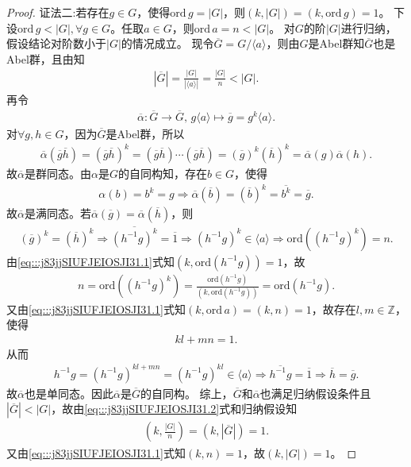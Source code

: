 \documentclass[../../main.tex]{subfiles}%
\begin{document}
\begin{proof}
{\color{blue}证法二:}若存在$g\in G$，使得$\mathrm{ord}\,g=|G|$，则$(k,|G|)=(k,\mathrm{ord}\,g)=1$。
下设$\mathrm{ord}\,g<|G|,\forall g\in G$。任取$a\in G$，则$\mathrm{ord}\,a=n<|G|$。
对$G$的阶$|G|$进行归纳，假设结论对阶数小于$|G|$的情况成立。
现令$\overline{G}=G/\langle a\rangle$，则由$G$是Abel群知$\overline{G}$也是Abel群，且由知
\begin{align}
|\overline{G}|=\frac{|G|}{|\langle a\rangle|}=\frac{|G|}{n}<|G|.
\label{eq:::j83jjSIUFJEIOSJI31.2}
\end{align}
再令
\begin{align*}
\overline{\alpha}:\overline{G}\to\overline{G},\, g\langle a\rangle\mapsto \overline{g}=g^k\langle a\rangle.
\end{align*}
对$\forall g,h\in G$，因为$\overline{G}$是Abel群，所以
\begin{align*}
\overline{\alpha}(\overline{g}\overline{h})=(\overline{g}\overline{h})^k=(\overline{g}\overline{h})\cdots(\overline{g}\overline{h})=(\overline{g})^k(\overline{h})^k=\overline{\alpha}(g)\overline{\alpha}(h).
\end{align*}
故$\overline{\alpha}$是群同态。由$\alpha$是$G$的自同构知，存在$b\in G$，使得
\begin{align*}
\alpha(b)=b^k=g\Longrightarrow \overline{\alpha}(\overline{b})=(\overline{b})^k=\overline{b^k}=\overline{g}.
\end{align*}
故$\overline{\alpha}$是满同态。若$\overline{\alpha}(\overline{g})=\overline{\alpha}(\overline{h})$，则
\begin{align*}
(\overline{g})^k=(\overline{h})^k\Longrightarrow \overline{(h^{-1}g)^k}=\overline{1}\Longrightarrow (h^{-1}g)^k\in\langle a\rangle\Longrightarrow \mathrm{ord}\left((h^{-1}g)^k\right)=n.
\end{align*}
由\eqref{eq:::j83jjSIUFJEIOSJI31.1}式知$(k,\mathrm{ord}(h^{-1}g))=1$，故
\begin{align*}
n=\mathrm{ord}\left((h^{-1}g)^k\right)=\frac{\mathrm{ord}(h^{-1}g)}{(k,\mathrm{ord}(h^{-1}g))}=\mathrm{ord}(h^{-1}g).
\end{align*}
又由\eqref{eq:::j83jjSIUFJEIOSJI31.1}式知$(k,\mathrm{ord}\,a)=(k,n)=1$，故存在$l,m\in\mathbb{Z}$，使得
\begin{align*}
kl+mn=1.
\end{align*}
从而
\begin{align*}
h^{-1}g=(h^{-1}g)^{kl+mn}=(h^{-1}g)^{kl}\in\langle a\rangle\Longrightarrow \overline{h^{-1}g}=\overline{1}\Longrightarrow \overline{h}=\overline{g}.
\end{align*}
故$\overline{\alpha}$也是单同态。因此$\overline{\alpha}$是$\overline{G}$的自同构。
综上，$\overline{G}$和$\overline{\alpha}$也满足归纳假设条件且$|\overline{G}|<|G|$，故由\eqref{eq:::j83jjSIUFJEIOSJI31.2}式和归纳假设知
\begin{align*}
\left(k,\frac{|G|}{n}\right)=(k,|\overline{G}|)=1.
\end{align*}
又由\eqref{eq:::j83jjSIUFJEIOSJI31.1}式知$(k,n)=1$，故$(k,|G|)=1$。
\end{proof}
\end{document}
